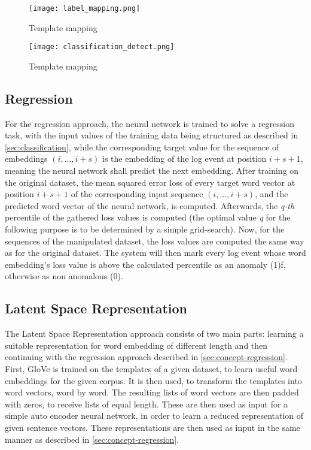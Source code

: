 \begin{figure}[H]
	\centering
	\captionsetup{justification=centering}
	\texttt{[image: label\_mapping.png]}
	\caption{Template mapping}
	\label{fig:label_mapping}
\end{figure}

\begin{figure}[H]
	\centering	
	\texttt{[image: classification\_detect.png]}
	\caption{Template mapping}
	\label{fig:label_mapping}
\end{figure}

\subsection{Regression \label{sec:regression}}
For the regression approach, the neural network is trained to solve a regression task, with the input values of the training data being structured as described in \ref{sec:classification}, while the corresponding target value for the sequence of embeddings $(i, ..., i+s)$ is the embedding of the log event at position $i+s+1$, meaning the neural network shall predict the next embedding. After training on the original dataset, the mean squared error loss of every target word vector at position $i+s+1$ of the corresponding input sequence $(i, ..., i+s)$, and the predicted word vector of the neural network, is computed. Afterwards, the \textit{q-th} percentile of the gathered loss values is computed (the optimal value \textit{q} for the following purpose is to be determined by a simple grid-search). Now, for the sequences of the manipulated dataset, the loss values are computed the same way as for the original dataset. The system will then mark every log event whose word embedding's loss value is above the calculated percentile as an anomaly (1)f, otherwise as non anomalous (0). 


\subsection{Latent Space Representation}
The Latent Space Representation approach consists of two main parts: learning a suitable representation for word embedding of different length and then continuing with the regression approach described in \ref{sec:concept-regression}. First, GloVe \cite{pennington2014glove} is trained on the templates of a given dataset, to learn useful word embeddings for the given corpus. It is then used, to transform the templates into word vectors, word by word. The resulting lists of word vectors are then padded with zeros, to receive lists of equal length. These are then used as input for a simple auto encoder neural network, in order to learn a reduced representation of given sentence vectors. These representations are then used as input in the same manner as described in \ref{sec:concept-regression}.

